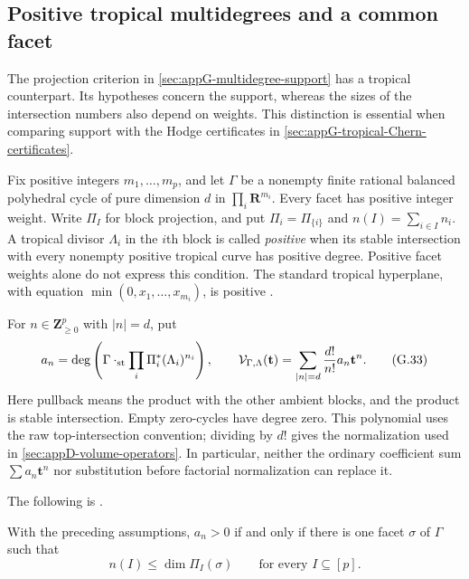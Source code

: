 \subsection{Positive tropical multidegrees and a common facet}
\label{sec:appG-tropical-positive-multidegrees}

The projection criterion in \cref{sec:appG-multidegree-support}
has a tropical counterpart. Its hypotheses concern the support,
whereas the sizes of the intersection numbers also depend on
weights. This distinction is essential when comparing support
with the Hodge certificates in
\cref{sec:appG-tropical-Chern-certificates}.

Fix positive integers $m_1,\ldots,m_p$, and let $\Gamma$ be
a nonempty finite rational balanced polyhedral cycle of pure
dimension $d$ in $\prod_i\mathbf R^{m_i}$. Every facet has
positive integer weight. Write $\Pi_I$ for block projection,
and put $\Pi_i=\Pi_{\{i\}}$ and $n(I)=\sum_{i\in I}n_i$.
A tropical divisor $\Lambda_i$
in the $i$th block is called \emph{positive} when its stable
intersection with every nonempty positive tropical curve has
positive degree. Positive facet weights alone do not express
this condition. The standard tropical hyperplane, with equation
$\min(0,x_1,\ldots,x_{m_i})$, is positive
\cite[Definition~2.7 and Corollary~2.16]{He24TropicalMultidegreesV2}.

For $n\in\mathbf Z_{\geq0}^p$ with $|n|=d$, put
\[
 a_n=\deg\left(\Gamma\mathbin{\cdot_{\rm st}}
             \prod_i\Pi_i^*(\Lambda_i)^{n_i}\right),\qquad
 \mathcal V_{\Gamma,\Lambda}(\mathbf t)
       =\sum_{|n|=d}\frac{d!}{n!}a_n\mathbf t^n.
\tag{G.33}\label{eq:appG-tropical-multidegree-volume}
\]
Here pullback means the product with the other ambient blocks,
and the product is stable intersection. Empty zero-cycles have
degree zero. This polynomial uses the raw top-intersection
convention; dividing by $d!$ gives the normalization used in
\cref{sec:appD-volume-operators}. In particular, neither the
ordinary coefficient sum $\sum a_n\mathbf t^n$ nor substitution
before factorial normalization can replace it.

The following is \cite[Theorem~3.5]{CidRuiz26TropicalMultidegreesV2}.
\begin{theorem}
\label{thm:appG-tropical-facet-positivity}
With the preceding assumptions, $a_n>0$ if and only if there
is one facet $\sigma$ of $\Gamma$ such that
\[
 n(I)\leq\dim\Pi_I(\sigma)\qquad
                         \text{for every }I\subseteq[p].
\tag{G.34}\label{eq:appG-tropical-common-facet}
\]
\end{theorem}

